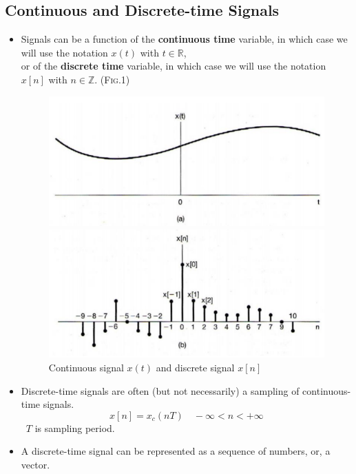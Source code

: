 \subsection{Continuous and Discrete-time Signals}
 \begin{itemize}
    \item Signals can be a function of the \textbf{continuous time} variable, in which case we will use the notation $x(t)$ with $t \in \mathbb{R}$, \\
    or of the \textbf{discrete time} variable, in which case we will use the notation $x[n]$ with $n \in \mathbb{Z}$. (\textsc{Fig.1})

 
 \begin{figure}[H]
 \begin{minipage}{0.5\textwidth}
  \includegraphics[width = \textwidth]{images/continuous_signals}
  \end{minipage} \hfill
  \begin{minipage}{0.5\textwidth}
  \includegraphics[width=\textwidth]{images/discrete_signals}
  \end{minipage}
  \caption{Continuous signal $x(t)$ and discrete signal $x[n]$ }
 \end{figure}
 
    \item Discrete-time signals are often (but not necessarily) a sampling of continuous-time signals.
    \[ x[n] = x_{c}(nT) \quad -\infty < n < +\infty \]\ $T$ is sampling period.
 
    \item A discrete-time signal can be represented as a sequence of numbers, or, a vector.
 \end{itemize}

